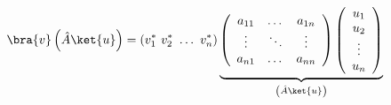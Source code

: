\begin{equation}
\bra{v}\left(\hat{A}\ket{u}\right) = (v_1^*\ v_2^*\ \dots\ v_n^*)\underbrace{\left(\begin{array}{ccc}
a_{11} & \dots & a_{1n}\\
\vdots &\ddots &\vdots\\
a_{n1} & \dots & a_{nn}
\end{array}\right)\left(\begin{array}{c}
u_1\\
u_2\\
\vdots\\
u_n
\end{array}\right)}_{\left(\hat{A}\ket{u}\right)}\\
\end{equation}




